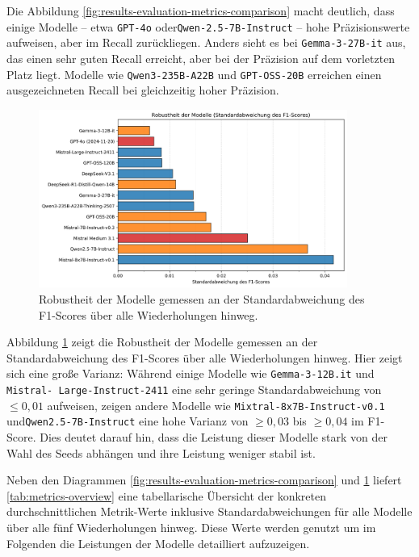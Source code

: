 Die Abbildung \ref{fig:results-evaluation-metrics-comparison} macht deutlich, dass einige Modelle – etwa \texttt{GPT-4o} oder\linebreak\texttt{Qwen-2.5-7B-Instruct} – hohe Präzisionswerte aufweisen, aber im Recall zurückliegen. Anders sieht es bei \texttt{Gemma-3-27B-it} aus, das einen sehr guten Recall erreicht, aber bei der Präzision auf dem vorletzten Platz liegt. Modelle wie \texttt{Qwen3-235B-A22B} und \texttt{GPT-OSS-20B} erreichen einen ausgezeichneten Recall bei gleichzeitig hoher Präzision.

\begin{figure}[htbp]
    \centering
    \includegraphics[width=0.9\textwidth]{images/results/evaluation_robustness_f1_std}
    \caption{Robustheit der Modelle gemessen an der Standardabweichung des F1-Scores über alle Wiederholungen hinweg.}
    \label{fig:results-evaluation-robustness-f1-std}
\end{figure}

Abbildung \ref{fig:results-evaluation-robustness-f1-std} zeigt die Robustheit der Modelle gemessen an der Standardabweichung des F1-Scores über alle Wiederholungen hinweg. Hier zeigt sich eine große Varianz: Während einige Modelle wie \texttt{Gemma-3-12B.it} und \texttt{Mistral-\linebreak~Large-Instruct-2411} eine sehr geringe Standardabweichung von $\le 0{,}01$ aufweisen, zeigen andere Modelle wie \texttt{Mixtral-8x7B-Instruct-v0.1} und\linebreak\texttt{Qwen2.5-7B-Instruct} eine hohe Varianz von $\ge 0{,}03$ bis $\ge 0{,}04$ im F1-Score. Dies deutet darauf hin, dass die Leistung dieser Modelle stark von der Wahl des Seeds abhängen und ihre Leistung weniger stabil ist.

Neben den Diagrammen \ref{fig:results-evaluation-metrics-comparison} und \ref{fig:results-evaluation-robustness-f1-std} liefert \autoref{tab:metrics-overview} eine tabellarische
Übersicht der konkreten durchschnittlichen Metrik-Werte inklusive Standardabweichungen für alle Modelle über alle fünf Wiederholungen hinweg. Diese Werte werden genutzt um im Folgenden die Leistungen der Modelle detailliert aufzuzeigen.

